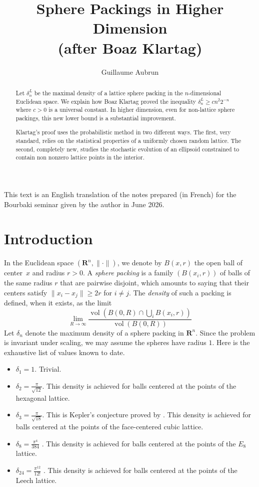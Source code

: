 \documentclass[12pt]{amsart}
\title{Sphere Packings in Higher Dimension \\ (after Boaz Klartag)}
\author{Guillaume Aubrun}
\newcommand{\R}{\mathbf{R}}
\newcommand{\iy}{\infty}
\DeclareMathOperator{\vol}{vol}
\renewcommand{\geq}{\geqslant}
\theoremstyle{plain}
\theoremstyle{remark}
\begin{document}
 
\begin{abstract}
Let $\delta_n^L$ be the maximal density of a lattice sphere packing in the $n$-dimensional Euclidean space. We explain how Boaz Klartag proved the inequality $\delta_n^L \geq c n^2 2^{-n}$ where $c>0$ is a universal constant. In higher dimension, even for non-lattice sphere packings, this new lower bound is a substantial improvement.

Klartag's proof uses the probabilistic method in two different ways. The first, very standard, relies on the statistical properties of a uniformly chosen random lattice. The second, completely new, studies the stochastic evolution of an ellipsoid constrained to contain non nonzero lattice points in the interior.
\end{abstract}
 
\maketitle

This text is an English translation of the notes prepared (in French) for the Bourbaki seminar given by the author in June 2026.
 
\section{Introduction}
 
In the Euclidean space $(\R^n,\|\cdot\|)$, we denote by $B(x,r)$ the open ball of center~$x$ and radius $r>0$. A \emph{sphere packing} is a family $(B(x_i,r))$ of balls of the same radius $r$ that are pairwise disjoint, which amounts to saying that their centers satisfy $\|x_i-x_j\| \geq 2r$ for $i \neq j$. The \emph{density} of such a packing is defined, when it exists, as the limit
\[ \lim_{R \to \iy} \frac{\vol \left( B(0,R) \cap \bigcup_i B(x_i,r) \right)}{\vol ( B(0,R) )} \]
Let $\delta_n$ denote the maximum density of a sphere packing in $\R^n$. Since the problem is invariant under scaling, we may assume the spheres have radius $1$. %
Here is the exhaustive list of values known to date.
\begin{itemize}
\item $\delta_1=1$. Trivial.
\item $\delta_2 = \frac{\pi}{\sqrt{12}}$. This density is achieved for balls centered at the points of the hexagonal lattice.
\item $\delta_3 = \frac{\pi}{\sqrt{18}}$. This is Kepler's conjecture proved by \cite{Hales05}. This density is achieved for balls centered at the points of the face-centered cubic lattice.
\item $\delta_8 = \frac{\pi^4}{384}$ \cite{Viazovska17}. This density is achieved for balls centered at the points of the $E_8$ lattice.
\item $\delta_{24} = \frac{\pi^{12}}{12!}$ \cite{CKMRV17}. This density is achieved for balls centered at the points of the Leech lattice.
\end{itemize}
 
\end{document}
